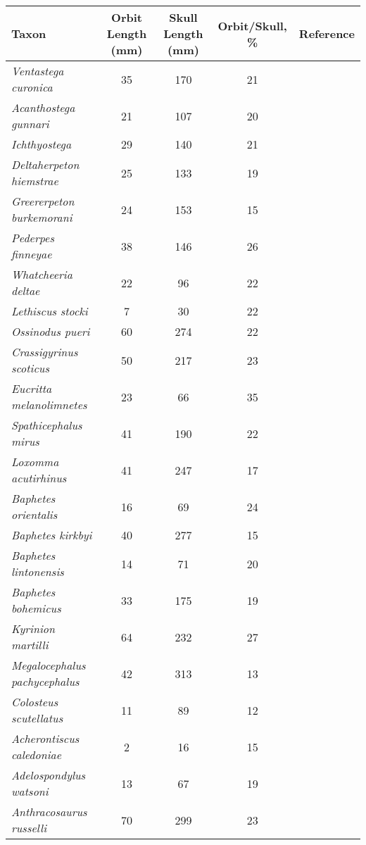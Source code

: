 \begin{tabular}{|L{4.5cm}|c|c|c|L{4.5cm}|}
\hline
\textbf{Taxon}&\textbf{Orbit Length (mm)}&\textbf{Skull Length (mm)}&\textbf{Orbit/Skull, \%}&\textbf{Reference}\\\hline
\textit{Ventastega curonica}&35&170&21&\citet{Ahlb08a}\\\hline
\textit{Acanthostega gunnari}&21&107&20&\citet{Clac02b,Porr15a}\\\hline
\textit{Ichthyostega}&29&140&21&\citet{Bent90a}\\\hline
\textit{Deltaherpeton hiemstrae}&25&133&19&\citet{Bolt10a}\\\hline
\textit{Greererpeton burkemorani}&24&153&15&\citet{Bent90a}\\\hline
\textit{Pederpes finneyae}&38&146&26&\citet{Clac02a}\\\hline
\textit{Whatcheeria deltae}&22&96&22&\citet{Lomb95a}\\\hline
\textit{Lethiscus stocki}&7&30&22&\citet{Well82a}\\\hline
\textit{Ossinodus pueri}&60&274&22&\citet{Warr04a,Warr07a}\\\hline
\textit{Crassigyrinus scoticus}&50&217&23&\citet{Panc85a}\\\hline
\textit{Eucritta melanolimnetes}&23&66&35&\citet{Clac98a}\\\hline
\textit{Spathicephalus mirus}&41&190&22&\citet{Beau98a}\\\hline
\textit{Loxomma acutirhinus}&41&247&17&\citet{Beau77a}\\\hline
\textit{Baphetes orientalis}&16&69&24&\citet{Miln09a}\\\hline
\textit{Baphetes kirkbyi}&40&277&15&\citet{Beau77a}\\\hline
\textit{Baphetes lintonensis}&14&71&20&\citet{Beau77a}\\\hline
\textit{Baphetes bohemicus}&33&175&19&\citet{Beau77a}\\\hline
\textit{Kyrinion martilli}&64&232&27&\citet{Clac03a}\\\hline
\textit{Megalocephalus pachycephalus}&42&313&13&\citet{Beau77a}\\\hline
\textit{Colosteus scutellatus}&11&89&12&\citet{Hook83a}\\\hline
\textit{Acherontiscus caledoniae}&2&16&15&\citet{Carr69a}\\\hline
\textit{Adelospondylus watsoni}&13&67&19&\citet{Carr67a}\\\hline
\textit{Anthracosaurus russelli}&70&299&23&\citet{Panc77a}\\\hline

\end{tabular}
